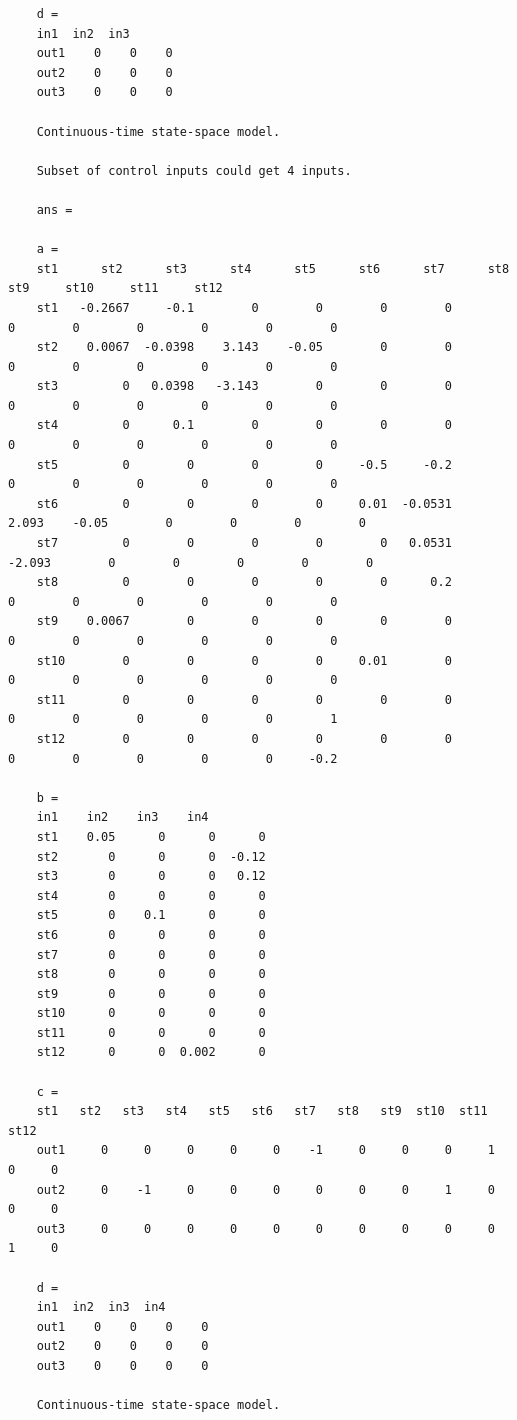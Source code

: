 \documentclass[14pt,a4paper]{article}
\begin{document}
\begin{lstlisting}
	d = 
	in1  in2  in3
	out1    0    0    0
	out2    0    0    0
	out3    0    0    0
	
	Continuous-time state-space model.
	
	Subset of control inputs could get 4 inputs.
	
	ans =
	
	a = 
	st1      st2      st3      st4      st5      st6      st7      st8      st9     st10     st11     st12
	st1   -0.2667     -0.1        0        0        0        0        0        0        0        0        0        0
	st2    0.0067  -0.0398    3.143    -0.05        0        0        0        0        0        0        0        0
	st3         0   0.0398   -3.143        0        0        0        0        0        0        0        0        0
	st4         0      0.1        0        0        0        0        0        0        0        0        0        0
	st5         0        0        0        0     -0.5     -0.2        0        0        0        0        0        0
	st6         0        0        0        0     0.01  -0.0531    2.093    -0.05        0        0        0        0
	st7         0        0        0        0        0   0.0531   -2.093        0        0        0        0        0
	st8         0        0        0        0        0      0.2        0        0        0        0        0        0
	st9    0.0067        0        0        0        0        0        0        0        0        0        0        0
	st10        0        0        0        0     0.01        0        0        0        0        0        0        0
	st11        0        0        0        0        0        0        0        0        0        0        0        1
	st12        0        0        0        0        0        0        0        0        0        0        0     -0.2
	
	b = 
	in1    in2    in3    in4
	st1    0.05      0      0      0
	st2       0      0      0  -0.12
	st3       0      0      0   0.12
	st4       0      0      0      0
	st5       0    0.1      0      0
	st6       0      0      0      0
	st7       0      0      0      0
	st8       0      0      0      0
	st9       0      0      0      0
	st10      0      0      0      0
	st11      0      0      0      0
	st12      0      0  0.002      0
	
	c = 
	st1   st2   st3   st4   st5   st6   st7   st8   st9  st10  st11  st12
	out1     0     0     0     0     0    -1     0     0     0     1     0     0
	out2     0    -1     0     0     0     0     0     0     1     0     0     0
	out3     0     0     0     0     0     0     0     0     0     0     1     0
	
	d = 
	in1  in2  in3  in4
	out1    0    0    0    0
	out2    0    0    0    0
	out3    0    0    0    0
	
	Continuous-time state-space model.
	\end{lstlisting}
	
\end{document}

